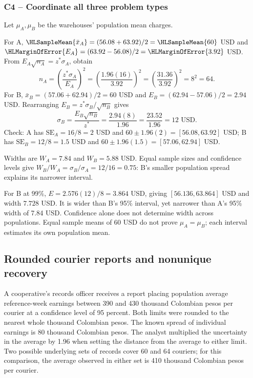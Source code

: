 \subsubsection*{C4 -- Coordinate all three problem types}\label{sol:c4-advanced-1}
Let $\mu_A,\mu_B$ be the warehouses' population mean charges. 

For A, $\HLSampleMean{\bar x_A}=(56.08+63.92)/2=\HLSampleMean{60}$ USD and $\HLMarginOfError{E_A}=(63.92-56.08)/2=\HLMarginOfError{3.92}$ USD.
From $E_A\sqrt{n_A}=z^*\sigma_A$, obtain
\[
n_A=\left(\frac{z^*\sigma_A}{E_A}\right)^2
=\left(\frac{1.96(16)}{3.92}\right)^2
=\left(\frac{31.36}{3.92}\right)^2=8^2=64.
\]
For B, $\bar x_B=(57.06+62.94)/2=60$ USD and $E_B=(62.94-57.06)/2=2.94$ USD. Rearranging $E_B=z^*\sigma_B/\sqrt{n_B}$ gives
\[
\sigma_B=\frac{E_B\sqrt{n_B}}{z^*}
=\frac{2.94(8)}{1.96}=\frac{23.52}{1.96}=12\text{ USD}.
\]
Check: A has $\mathrm{SE}_A=16/8=2$ USD and $60\pm1.96(2)=[56.08,63.92]$ USD; B has $\mathrm{SE}_B=12/8=1.5$ USD and $60\pm1.96(1.5)=[57.06,62.94]$ USD.

Widths are $W_A=7.84$ and $W_B=5.88$ USD. Equal sample sizes and confidence levels give $W_B/W_A=\sigma_B/\sigma_A=12/16=0.75$: B's smaller population spread explains its narrower interval.

For B at 99\%, $E=2.576(12)/8=3.864$ USD, giving $[56.136,63.864]$ USD and width $7.728$ USD. It is wider than B's 95\% interval, yet narrower than A's 95\% width of 7.84 USD. Confidence alone does not determine width across populations. Equal sample means of 60 USD do not prove $\mu_A=\mu_B$; each interval estimates its own population mean.

\clearpage
\subsection{Rounded courier reports and nonunique recovery}\label{prob:c4-advanced-2}
A cooperative's records officer receives a report placing population average reference-week earnings between 390 and 430 thousand Colombian pesos per courier at a confidence level of 95 percent. Both limits were rounded to the nearest whole thousand Colombian pesos. The known spread of individual earnings is 80 thousand Colombian pesos. The analyst multiplied the uncertainty in the average by 1.96 when setting the distance from the average to either limit. Two possible underlying sets of records cover 60 and 64 couriers; for this comparison, the average observed in either set is 410 thousand Colombian pesos per courier.


